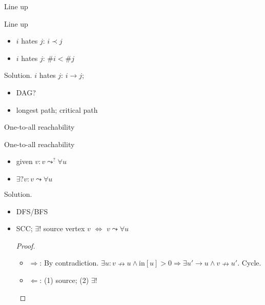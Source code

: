 \begin{frame}{Line up}
  \begin{exampleblock}{Line up }
    \begin{itemize}
      \item $i$ hates $j$: $i \prec j$
      \item $i$ hates $j$: $\# i < \# j$
    \end{itemize}
  \end{exampleblock}

  \begin{block}{Solution.}
    $i$ hates $j$: $i \to j$;
    \begin{itemize}
      \item DAG?
      \item longest path; critical path
      \end{itemize}
  \end{block}
\end{frame}
\begin{frame}{One-to-all reachability}
  \begin{exampleblock}{One-to-all reachability }
    \begin{itemize}
      \item given $v: v \leadsto^{?} \forall u$
      \item $\exists? v: v \leadsto \forall u$
    \end{itemize}
  \end{exampleblock}

  \begin{block}{Solution.}
    \begin{itemize}
      \item DFS/BFS
      \item SCC; $\exists!$ source vertex $v$ $\iff$ $v \leadsto \forall u$
	\begin{proof}
	  \begin{itemize}
	    \item $\Rightarrow$: By contradiction. $\exists u: v \nrightarrow u \land \text{in}[u] > 0 \Rightarrow \exists u' \to u \land v \nrightarrow u'$. Cycle. 
	    \item $\Leftarrow$: (1) source; (2) $\exists !$
	  \end{itemize}
	\end{proof}
    \end{itemize}
  \end{block}
\end{frame}
